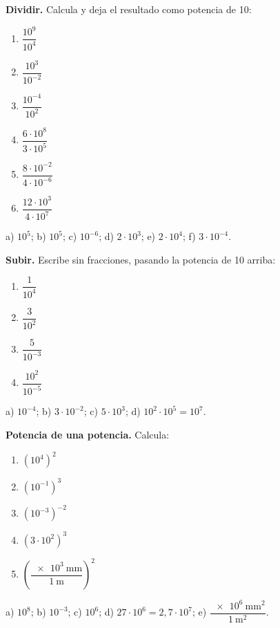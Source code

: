 \begin{exercise}
    \textbf{Dividir.} Calcula y deja el resultado como potencia de 10:
    \begin{enumerate}[label=\letraminuscula]
        \item \(\dfrac{10^{9}}{10^{4}}\)
        \item \(\dfrac{10^{3}}{10^{-2}}\)
        \item \(\dfrac{10^{-4}}{10^{2}}\)
        \item \(\dfrac{6 \cdot 10^{8}}{3 \cdot 10^{5}}\)
        \item \(\dfrac{8 \cdot 10^{-2}}{4 \cdot 10^{-6}}\)
        \item \(\dfrac{12 \cdot 10^{3}}{4 \cdot 10^{7}}\)
    \end{enumerate}
    \begin{solu}
        a) \(10^{5}\); b) \(10^{5}\); c) \(10^{-6}\); d) \(2 \cdot 10^{3}\); e) \(2 \cdot 10^{4}\); f) \(3 \cdot 10^{-4}\).
    \end{solu}
\end{exercise}

\begin{exercise}
    \textbf{Subir.} Escribe sin fracciones, pasando la potencia de 10 arriba:
    \begin{enumerate}[label=\letraminuscula]
        \item \(\dfrac{1}{10^{4}}\)
        \item \(\dfrac{3}{10^{2}}\)
        \item \(\dfrac{5}{10^{-3}}\)
        \item \(\dfrac{10^{2}}{10^{-5}}\)
    \end{enumerate}
    \begin{solu}
        a) \(10^{-4}\); b) \(3 \cdot 10^{-2}\); c) \(5 \cdot 10^{3}\); d) \(10^{2} \cdot 10^{5} = 10^{7}\).
    \end{solu}
\end{exercise}

\begin{exercise}
    \textbf{Potencia de una potencia.} Calcula:
    \begin{enumerate}[label=\letraminuscula]
        \item \(\left(10^{4}\right)^{2}\)
        \item \(\left(10^{-1}\right)^{3}\)
        \item \(\left(10^{-3}\right)^{-2}\)
        \item \(\left(3 \cdot 10^{2}\right)^{3}\)
        \item \(\left(\dfrac{\qty{e3}{\mm}}{\qty{1}{\m}}\right)^{2}\)
    \end{enumerate}
    \begin{solu}
        a) \(10^{8}\); b) \(10^{-3}\); c) \(10^{6}\); d) \(27 \cdot 10^{6} = 2{,}7 \cdot 10^{7}\); e) \(\dfrac{\qty{e6}{\square\mm}}{\qty{1}{\square\m}}\).
    \end{solu}
\end{exercise}

